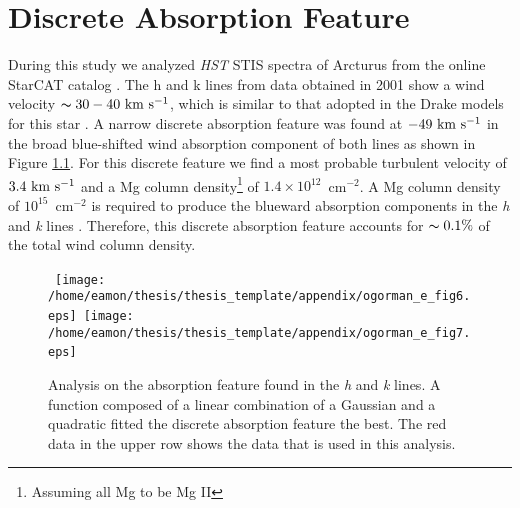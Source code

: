 
\chapter{Discrete Absorption Feature}\label{app:2}

During this study we analyzed \textit{HST} STIS spectra of Arcturus from the online StarCAT catalog \citep{ayres_2010}. The  h and k lines from data obtained in 2001 show a wind velocity $ \thicksim 30-40 \ \rm{km \ s^{-1}}$, which is similar to that adopted in the Drake models for this star \cite{drake_1985}. A narrow discrete absorption feature was found at $-49 \ \rm{km \ s^{-1}}$ in the broad blue-shifted wind absorption component of both lines as shown in Figure \ref{fig:app2}. For this discrete feature we find a most probable turbulent velocity of $ 3.4 \ \rm{km \ s^{-1}}$ and a Mg column density\footnote{Assuming all Mg to be Mg II} of $1.4\times10^{12}$\, cm$^{-2}$. A Mg column density of $10^{15}$\, cm$^{-2}$ is required to produce the blueward absorption components in the \textit{h} and \textit{k} lines \citep{mcclintock_1978}. Therefore, this discrete absorption feature accounts for $\thicksim 0.1 \%$ of the total wind column density. 

\begin{figure}[hb!]
\centering 
\mbox{
          \texttt{[image: /home/eamon/thesis/thesis\_template/appendix/ogorman\_e\_fig6.eps]} 
          \texttt{[image: /home/eamon/thesis/thesis\_template/appendix/ogorman\_e\_fig7.eps]}
          }
\caption[]{Analysis on the absorption feature found in the  \textit{h} and \textit{k} lines. A function composed of a linear combination of a Gaussian and a quadratic fitted the discrete absorption feature the best. The red data in the upper row shows the data that is used in this analysis.}
\label{fig:app2}
\end{figure}